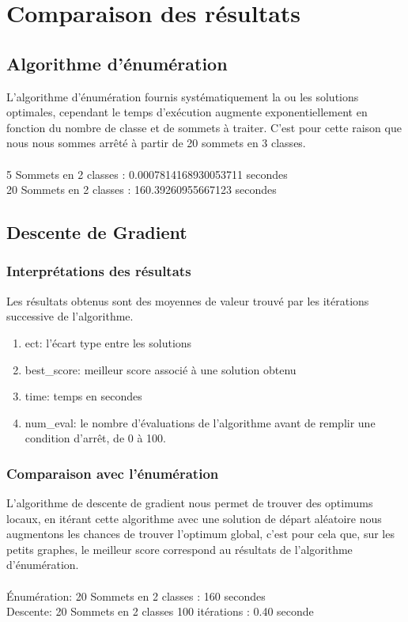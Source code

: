 \documentclass[a4paper]{article}
\begin{document}
\section{Comparaison des résultats}

\subsection{Algorithme d'énumération}
L'algorithme d'énumération fournis systématiquement la ou les solutions optimales, cependant le temps d’exécution augmente exponentiellement en fonction du nombre de classe et de sommets à traiter. C'est pour cette raison que nous nous sommes arrêté à partir de 20 sommets en 3 classes.\\\\
5 Sommets en 2 classes : 0.0007814168930053711 secondes\\
20 Sommets en 2 classes : 160.39260955667123 secondes

\subsection{Descente de Gradient}

\subsubsection{Interprétations des résultats}
Les résultats obtenus sont des moyennes de valeur trouvé par les itérations successive de l'algorithme.\\
\begin{enumerate}
	\item{ect}: l'écart type entre les solutions
	\item{best\_score}: meilleur score associé à une solution obtenu
	\item{time}: temps en secondes
	\item{num\_eval}: le nombre d'évaluations de l'algorithme avant de remplir une condition d'arrêt, de 0 à 100.
\end{enumerate}

\subsubsection{Comparaison avec l'énumération}
L'algorithme de descente de gradient nous permet de trouver des optimums locaux, en itérant cette algorithme avec une solution de départ aléatoire nous augmentons les chances de trouver l'optimum global, c'est pour cela que, sur les petits graphes, le meilleur score correspond au résultats de l'algorithme d'énumération.\\\\
Énumération: 20 Sommets en 2 classes : 160 secondes\\
Descente: 20 Sommets en 2 classes 100 itérations : 0.40 seconde\\
\end{document}
